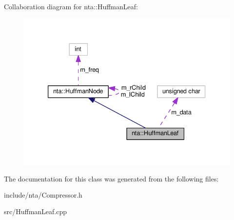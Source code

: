 Collaboration diagram for nta\+:\+:Huffman\+Leaf\+:
\nopagebreak
\begin{figure}[H]
\begin{center}
\leavevmode
\includegraphics[width=333pt]{d7/d69/classnta_1_1HuffmanLeaf__coll__graph}
\end{center}
\end{figure}


The documentation for this class was generated from the following files\+:\begin{DoxyCompactItemize}
\item 
include/nta/Compressor.\+h\item 
src/Huffman\+Leaf.\+cpp\end{DoxyCompactItemize}
